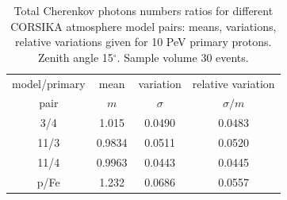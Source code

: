 \documentclass[universe,article,submit,moreauthors,pdftex]{Definitions/mdpi}
\begin{document}
\begin{paracol}{2}
\begin{table}[tbh]
\centering
\caption{Total Cherenkov photons numbers ratios for different CORSIKA atmosphere model pairs: means, variations, relative variations given for 10 PeV primary protons. Zenith angle 15$^\circ$. Sample volume 30 events.}
\label{tab:atmmod}
\begin{tabular}{cccc}
    \toprule
    model/primary   & mean &  variation   & relative variation \\ 
         pair       &  $m$ & $\sigma$     & $\sigma/m$ \\ 
    \midrule 
     3/4 &  1.015     &  0.0490     &   0.0483   \\
    11/3 &  0.9834    &  0.0511     &   0.0520   \\
    11/4 &  0.9963    &  0.0443     &   0.0445   \\
    \midrule
     p/Fe &  1.232     &  0.0686     &   0.0557   \\
    \bottomrule
\end{tabular}
\end{table}



\end{paracol}
\end{document}

